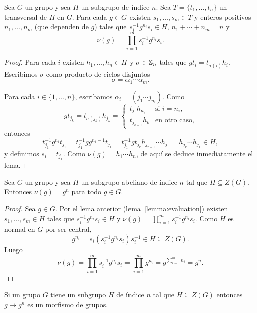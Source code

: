 
\begin{lemma}
	\label{lemma:evaluation}
	Sea $G$ un grupo y sea $H$ un subgrupo de índice $n$. Sea
	$T=\{t_1,\dots,t_n\}$ un transversal de $H$ en $G$.  Para cada $g\in G$
	existen $s_{1},\dots,s_{m}\in T$ y enteros positivos $n_1,\dots,n_m$
	(que dependen de $g$) tales que 
	$s_i^{-1}g^{n_i}s_i\in H$,
	$n_1+\cdots+n_m=n$ y 
	\[
		\nu(g)=\prod_{i=1}^m s_i^{-1}g^{n_i}s_i.
	\]
\end{lemma}


\begin{proof}
	Para cada $i$ existen $h_1,\dots,h_n\in H$ y $\sigma\in\mathbb{S}_n$ tales que
	$gt_i=t_{\sigma(i)}h_i$. Escribimos $\sigma$ como producto de ciclos
	disjuntos
	\[
		\sigma=\alpha_1\cdots\alpha_m.
	\]

	Para cada $i\in\{1,\dots,n\}$, escribamos 
	$\alpha_i=(j_{1}\cdots j_{n_i})$. Como 
	\[
		g t_{j_k}=t_{\sigma(j_k)}h_{j_k}=\begin{cases}
			t_{j_1}h_{n_i} & \text{si $i=n_i$},\\
			t_{j_{k+1}}h_{k} & \text{en otro caso},
		\end{cases}
	\]
	entonces
	\[
	t_{j_1}^{-1}g^{n_i}t_{j_1}
	=t_{j_1}^{-1}gg^{n_i-1}t_{j_1}
	=t_{j_1}^{-1}gt_{j_r}h_{j_{r-1}}\cdots h_{j_1}
	=h_{j_r}\cdots h_{j_1}\in H,
	\]
	y definimos $s_i=t_{j_1}$. Como $\nu(g)=h_1\cdots h_{n}$, 
	de aquí se deduce inmediatamente el lema.
\end{proof}

\begin{proposition}
	\label{proposition:v(g)=g^n}
	Sea $G$ un grupo y sea $H$ un subgrupo abeliano de índice $n$ tal que
	$H\subseteq Z(G)$. Entonces $\nu(g)=g^n$ para todo $g\in G$.
\end{proposition}

\begin{proof}
	Sea $g\in G$. Por el lema anterior (lema~\ref{lemma:evaluation}) existen $s_1,\dots,s_m\in
	H$ tales que $s_i^{-1}g^{n_i}s_i\in H$ y $\nu(g)=\prod_{i=1}^m
	s_i^{-1}g^{n_i}s_i$.  Como $H$ es normal en $G$ por ser central,
	\[
	g^{n_i}=s_i(s_i^{-1}g^{n_i}s_i)s_i^{-1}\in H\subseteq Z(G).
	\]
	Luego 
	\[
		\nu(g)
		=\prod_{i=1}^m s_i^{-1}g^{n_i}s_i
		=\prod_{i=1}^m g^{n_i}
		=g^{\sum_{i=1}^m n_i}
		=g^n.
	\]
\end{proof}

\begin{corollary}
	Si un grupo $G$ tiene un subgrupo $H$ de índice $n$ tal que $H\subseteq
	Z(G)$ entonces $g\mapsto g^n$ es un morfismo de grupos.
\end{corollary}

